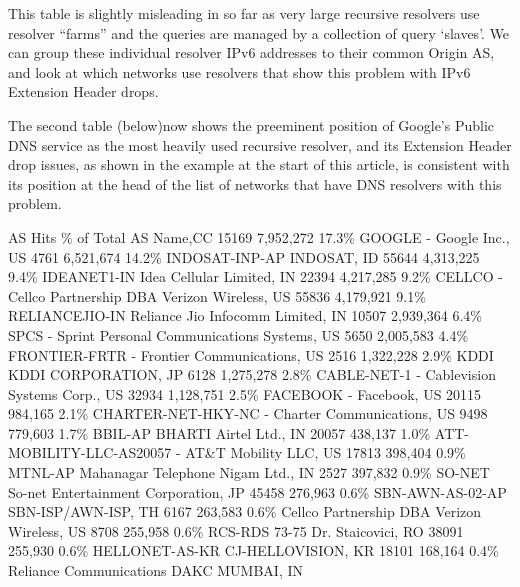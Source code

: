 This table is slightly misleading in so far as very large recursive resolvers use resolver “farms” and the queries are managed by a collection of query ‘slaves’. We can group these individual resolver IPv6 addresses to their common Origin AS, and look at which networks use resolvers that show this problem with IPv6 Extension Header drops.

The second table (below)now shows the preeminent position of Google’s Public DNS service as the most heavily used recursive resolver, and its Extension Header drop issues, as shown in the example at the start of this article, is consistent with its position at the head of the list of networks that have DNS resolvers with this problem.

AS Hits  \% of Total  AS Name,CC
15169    7,952,272   17.3\% GOOGLE - Google Inc., US
4761  6,521,674   14.2\% INDOSAT-INP-AP INDOSAT, ID
55644 4,313,225   9.4\%  IDEANET1-IN Idea Cellular Limited, IN
22394 4,217,285   9.2\%  CELLCO - Cellco Partnership DBA Verizon Wireless, US
55836 4,179,921   9.1\%  RELIANCEJIO-IN Reliance Jio Infocomm Limited, IN
10507 2,939,364   6.4\%  SPCS - Sprint Personal Communications Systems, US
5650  2,005,583   4.4\%  FRONTIER-FRTR - Frontier Communications, US
2516  1,322,228   2.9\%  KDDI KDDI CORPORATION, JP
6128  1,275,278   2.8\%  CABLE-NET-1 - Cablevision Systems Corp., US
32934 1,128,751   2.5\%  FACEBOOK - Facebook, US
20115 984,165  2.1\%  CHARTER-NET-HKY-NC - Charter Communications, US
9498  779,603  1.7\%  BBIL-AP BHARTI Airtel Ltd., IN
20057 438,137  1.0\%  ATT-MOBILITY-LLC-AS20057 - AT\&T Mobility LLC, US
17813 398,404  0.9\%  MTNL-AP Mahanagar Telephone Nigam Ltd., IN
2527  397,832  0.9\%  SO-NET So-net Entertainment Corporation, JP
45458 276,963  0.6\%  SBN-AWN-AS-02-AP SBN-ISP/AWN-ISP, TH
6167  263,583  0.6\%  Cellco Partnership DBA Verizon Wireless, US
8708  255,958  0.6\%  RCS-RDS 73-75 Dr. Staicovici, RO
38091 255,930  0.6\%  HELLONET-AS-KR CJ-HELLOVISION, KR
18101 168,164  0.4\%  Reliance Communications DAKC MUMBAI, IN





